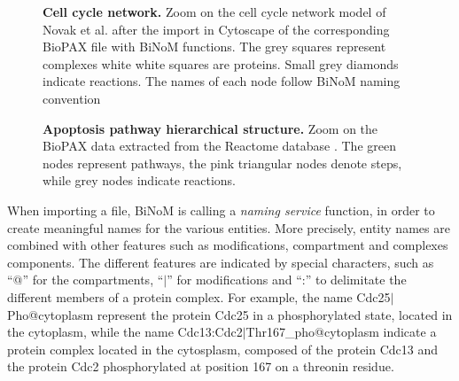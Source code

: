\documentclass[10pt]{bmc_article}
\newenvironment{bmcformat}{\baselineskip20pt\sloppy\setboolean{publ}{false}}{\baselineskip20pt\sloppy}
\begin{document}
\begin{bmcformat}
\begin{figure}[h]
 \caption{\label{mphasebiopax}  \textbf{Cell cycle network.} Zoom on the cell
cycle network model of Novak et al. \cite{novak1998model} after the import in 
Cytoscape of the corresponding BioPAX file with BiNoM functions. The grey
squares represent complexes white white squares are proteins. Small grey diamonds
indicate reactions. The names of each node follow BiNoM naming convention}
\end{figure}

\begin{figure}[h]
 \caption{\label{apoptosishierarchical}  \textbf{Apoptosis pathway hierarchical
structure.} Zoom on the BioPAX data extracted from the Reactome database
\cite{joshi2005reactome}. The green nodes represent pathways, the pink
triangular nodes denote steps, while grey nodes indicate reactions.}
\end{figure}


When importing a file, BiNoM is calling a \emph{naming service} function, in
order to create meaningful names for the various entities. More precisely,
entity names are combined with other features such as modifications, compartment
and complexes components. The different features are indicated by special
characters, such as ``@'' for the compartments, ``$|$'' for modifications and
``:'' to delimitate the different members of a protein complex. For example, the
name Cdc25$|$Pho@cytoplasm represent the protein Cdc25 in a phosphorylated
state, located in the cytoplasm, while the name
Cdc13:Cdc2$|$Thr167\_pho@cytoplasm indicate a protein complex located in the
cytosplasm, composed of the protein Cdc13 and the protein Cdc2 phosphorylated at
position 167 on a threonin residue.



\end{bmcformat}
\end{document}
